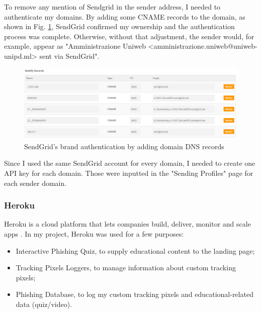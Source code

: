 \documentclass[a4paper]{article}
\begin{document}
To remove any mention of Sendgrid in the sender address, I needed to authenticate my domains. By adding some CNAME records to the domain, as shown in Fig. \ref{freenom-dns}, SendGrid confirmed my ownership and the authentication process was complete. Otherwise, without that adjustment, the sender would, for example, appear as "Amministrazione Uniweb <amministrazione.uniweb@uniweb-unipd.ml> sent via SendGrid".

\begin{figure}[H]
	\centering
	\includegraphics[scale=0.32]{images/tools/freenom-dns.PNG}
	\caption{SendGrid's brand authentication by adding domain DNS records}
	\label{freenom-dns}
\end{figure}

\noindent
Since I used the same SendGrid account for every domain, I needed to create one API key for each domain. Those were inputted in the "Sending Profiles" page for each sender domain.

\newpage

\subsubsection{Heroku}

Heroku is a cloud platform that lets companies build, deliver, monitor and scale apps \cite{tools-heroku}. In my project, Heroku was used for a few purposes: 

\begin{itemize}
    \item Interactive Phishing Quiz, to supply educational content to the landing page;
    \item Tracking Pixels Loggers, to manage information about custom tracking pixels;
    \item Phishing Database, to log my custom tracking pixels and educational-related data (quiz/video).
\end{itemize}
\end{document}

